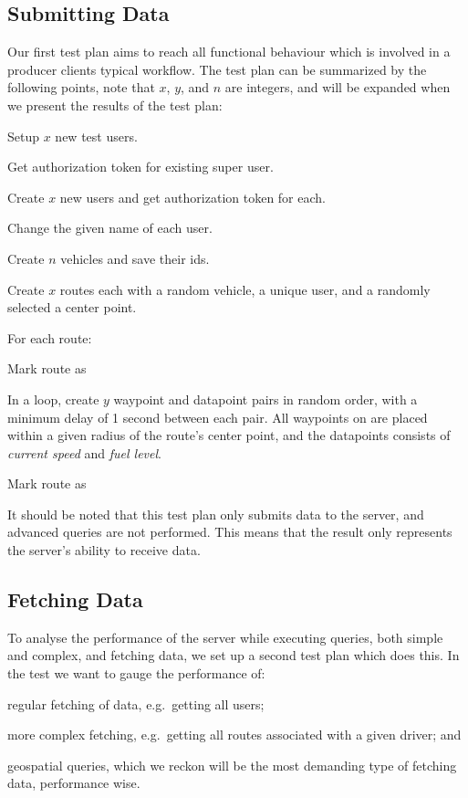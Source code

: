 \subsection{Submitting Data}
Our first test plan aims to reach all functional behaviour which is involved in a producer clients typical workflow.
The test plan can be summarized by the following points, note that $x$, $y$, and $n$ are integers, and will be expanded when we present the results of the test plan:
\begin{enumberate}
    \item Setup $x$ new test users.
    \begin{enumberate}
        \item Get authorization token for existing super user.
        \item Create $x$ new users and get authorization token for each.
        \item Change the given name of each user.
    \end{enumberate}
    \item Create $n$ vehicles and save their ids.
    \item Create $x$ routes each with a random vehicle, a unique user, and a randomly selected a center point.
    \item For each route:
    \begin{enumberate}
        \item Mark route as 
        \item In a loop, create $y$ waypoint and datapoint pairs in random order, with a minimum delay of 1 second between each pair.
              All waypoints on are placed within a given radius of the route's center point, and the datapoints consists of \textit{current speed} and \textit{fuel level}.
        \item Mark route as 
    \end{enumberate}
\end{enumberate}

It should be noted that this test plan only submits data to the server, and advanced queries are not performed.
This means that the result only represents the server's ability to receive data.

\subsection{Fetching Data}
To analyse the performance of the server while executing queries, both simple and complex, and fetching data, we set up a second test plan which does this.
In the test we want to gauge the performance of:
\begin{enumberate}
    \item regular fetching of data, e.g.~getting all users;
    \item more complex fetching, e.g.~getting all routes associated with a given driver; and
    \item geospatial queries, which we reckon will be the most demanding type of fetching data, performance wise.
\end{enumberate}

